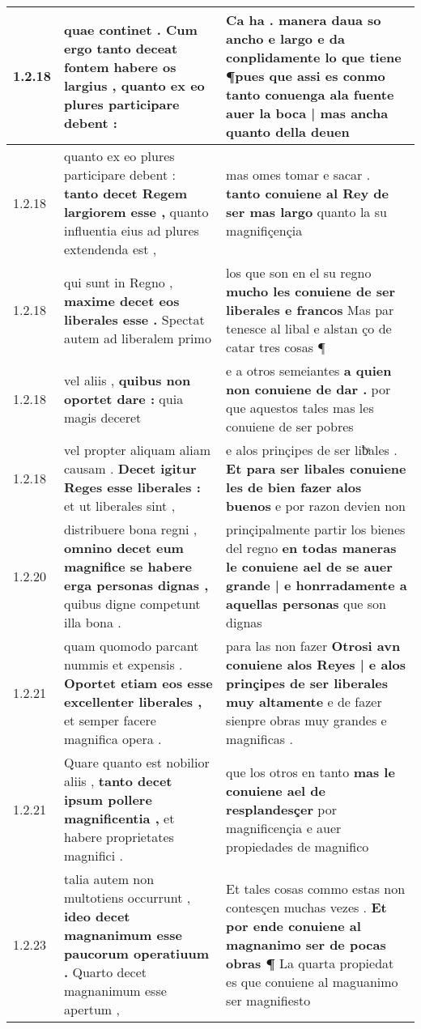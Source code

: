 \begin{tabular}{|p{1cm}|p{6.5cm}|p{6.5cm}|}
1.2.18 & quae continet . \textbf{ Cum ergo tanto deceat fontem habere os largius , } quanto ex eo plures participare debent : & Ca ha . manera daua so ancho e largo e da conplidamente lo que tiene \textbf{ ¶pues que assi es conmo tanto conuenga ala fuente auer la boca | mas ancha } quanto della deuen \\\hline
1.2.18 & quanto ex eo plures participare debent : \textbf{ tanto decet Regem largiorem esse , } quanto influentia eius ad plures extendenda est , & mas omes tomar e sacar . \textbf{ tanto conuiene al Rey de ser mas largo } quanto la su magnifiçençia \\\hline
1.2.18 & qui sunt in Regno , \textbf{ maxime decet eos liberales esse . } Spectat autem ad liberalem primo & los que son en el su regno \textbf{ mucho les conuiene de ser liberales e francos } Mas par tenesce al libal e alstan ço de catar tres cosas ¶ \\\hline
1.2.18 & vel aliis , \textbf{ quibus non oportet dare : } quia magis deceret & e a otros semeiantes \textbf{ a quien non conuiene de dar . } por que aquestos tales mas les conuiene de ser pobres \\\hline
1.2.18 & vel propter aliquam aliam causam . \textbf{ Decet igitur Reges esse liberales : } et ut liberales sint , & e alos prinçipes de ser liƀͣales . \textbf{ Et para ser libales conuiene les de bien fazer alos buenos } e por razon devien non \\\hline
1.2.20 & distribuere bona regni , \textbf{ omnino decet eum magnifice se habere erga personas dignas , } quibus digne competunt illa bona . & prinçipalmente partir los bienes del regno \textbf{ en todas maneras le conuiene ael de se auer grande | e honrradamente a aquellas personas } que son dignas \\\hline
1.2.21 & quam quomodo parcant nummis et expensis . \textbf{ Oportet etiam eos esse excellenter liberales , } et semper facere magnifica opera . & para las non fazer \textbf{ Otrosi avn conuiene alos Reyes | e alos prinçipes de ser liberales muy altamente } e de fazer sienpre obras muy grandes e magnificas . \\\hline
1.2.21 & Quare quanto est nobilior aliis , \textbf{ tanto decet ipsum pollere magnificentia , } et habere proprietates magnifici . & que los otros en tanto \textbf{ mas le conuiene ael de resplandesçer } por magnificençia e auer propiedades de magnifico \\\hline
1.2.23 & talia autem non multotiens occurrunt , \textbf{ ideo decet magnanimum esse paucorum operatiuum . } Quarto decet magnanimum esse apertum , & Et tales cosas commo estas non contesçen muchas vezes . \textbf{ Et por ende conuiene al magnanimo ser de pocas obras ¶ } La quarta propiedat es que conuiene al maguanimo ser magnifiesto \\\hline

\end{tabular}
